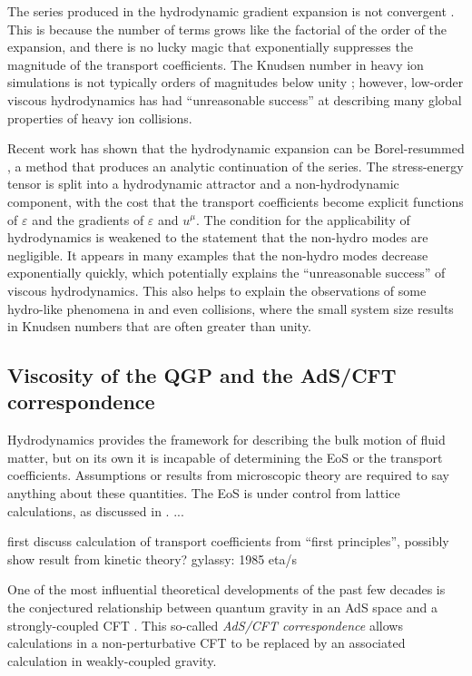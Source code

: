 The series produced in the hydrodynamic gradient expansion is not convergent \cite{Denicol:2016bjh}.
This is because the number of terms grows like the factorial of the order of the expansion, and there is no lucky magic that exponentially suppresses the magnitude of the transport coefficients.
The Knudsen number in heavy ion simulations is not typically orders of magnitudes below unity \cite{Niemi:2014wta}; however, low-order viscous hydrodynamics has had ``unreasonable success'' at describing many global properties of heavy ion collisions.

Recent work has shown that the hydrodynamic expansion can be Borel-resummed \cite{Romatschke:2016hle,Romatschke:2017vte}, a method that produces an analytic continuation of the series.
The stress-energy tensor is split into a hydrodynamic attractor and a non-hydrodynamic component, with the cost that the transport coefficients become explicit functions of $\varepsilon$ and the gradients of $\varepsilon$ and $u^\mu$.
The condition for the applicability of hydrodynamics is weakened to the statement that the non-hydro modes are negligible.
It appears in many examples that the non-hydro modes decrease exponentially quickly, which potentially explains the ``unreasonable success'' of viscous hydrodynamics.
This also helps to explain the observations of some hydro-like phenomena in \pPb and even \pp collisions, where the small system size results in Knudsen numbers that are often greater than unity.


\subsection{Viscosity of the QGP and the AdS/CFT correspondence}

Hydrodynamics provides the framework for describing the bulk motion of fluid matter, but on its own it is incapable of determining the \ac{EoS} or the transport coefficients.
Assumptions or results from microscopic theory are required to say anything about these quantities.
The \qcd \ac{EoS} is under control from lattice calculations, as discussed in . %
... 

first discuss calculation of transport coefficients from ``first principles'', possibly show result from kinetic theory?
gylassy: 1985 eta/s \cite{Danielewicz:1984ww} %

One of the most influential theoretical developments of the past few decades is the conjectured relationship between quantum gravity in an \ac{AdS} space and a strongly-coupled \ac{CFT} \cite{Maldacena:1997re}.
This so-called \emph{\ac{AdS}/\ac{CFT} correspondence} allows calculations in a non-perturbative \ac{CFT} to be replaced by an associated calculation in weakly-coupled gravity.

